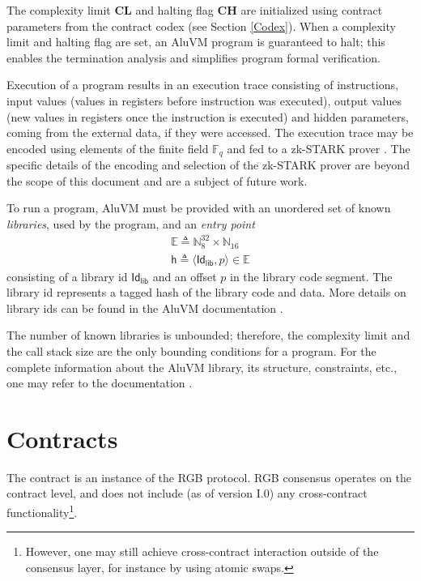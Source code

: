 \documentclass[9pt,oneside]{amsart}
\begin{document}
\begin{multicols}{2}
The complexity limit \textbf{CL} and halting flag \textbf{CH}
are initialized using contract parameters from the contract codex (see Section \ref{Codex}).
When a complexity limit and halting flag are set, an AluVM program is guaranteed to halt;
this enables the termination analysis and simplifies program formal verification.

Execution of a program results in an execution trace consisting of instructions,
input values (values in registers before instruction was executed),
output values (new values in registers once the instruction is executed)
and hidden parameters, coming from the external data, if they were accessed.
The execution trace may be encoded using elements of the finite field $\mathbb{F}_q$
and fed to a zk-STARK prover \cite{zkSTARKs}.
The specific details of the encoding and selection of the zk-STARK prover
are beyond the scope of this document and are a subject of future work.

To run a program, AluVM must be provided with an unordered set of known \emph{libraries},
used by the program, and an \emph{entry point}
\noindent
\begin{gather}\label{eq:e}
\mathbb{E} \triangleq \mathbb{N}^{32}_8 \times \mathbb{N}_{16} \\
\mathsf{h} \triangleq \langle \mathsf{Id_{lib}}, p \rangle \in \mathbb{E}
\end{gather}
\noindent
consisting of a library id $\mathsf{Id_{lib}}$ and an offset $p$ in the library code segment.
The library id represents a tagged hash of the library code and data.
More details on library ids can be found in the AluVM documentation \cite{AluVMCrate}.

The number of known libraries is unbounded; therefore, the complexity limit and the call stack size
are the only bounding conditions for a program.
For the complete information about the AluVM library, its structure, constraints, etc.,
one may refer to the documentation \cite{AluVM}.

\section{Contracts}\label{Contracts}

The contract is an instance of the RGB protocol. RGB consensus operates on the contract level,
and does not include (as of version I.0) any cross-contract functionality\footnote{%
    However, one may still achieve cross-contract interaction outside of the consensus layer,
    for instance by using atomic swaps.}.


\end{multicols}
\end{document}
